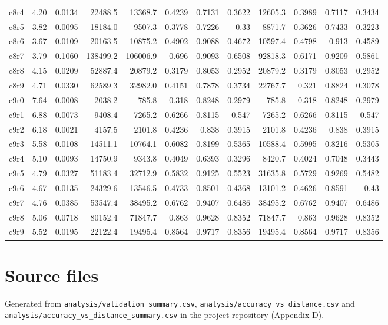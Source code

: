 \begin{landscape}
\begin{longtable}[]{@{}lrrrrrrrrrrr@{}}
c8r4 & 4.20 & 0.0134 & 22488.5 & 13368.7 & 0.4239 & 0.7131 & 0.3622 & 12605.3 & 0.3989 & 0.7117 & 0.3434 \\
c8r5 & 3.82 & 0.0095 & 18184.0 & 9507.3 & 0.3778 & 0.7226 & 0.33 & 8871.7 & 0.3626 & 0.7433 & 0.3223 \\
c8r6 & 3.67 & 0.0109 & 20163.5 & 10875.2 & 0.4902 & 0.9088 & 0.4672 & 10597.4 & 0.4798 & 0.913 & 0.4589 \\
c8r7 & 3.79 & 0.1060 & 138499.2 & 106006.9 & 0.696 & 0.9093 & 0.6508 & 92818.3 & 0.6171 & 0.9209 & 0.5861 \\
c8r8 & 4.15 & 0.0209 & 52887.4 & 20879.2 & 0.3179 & 0.8053 & 0.2952 & 20879.2 & 0.3179 & 0.8053 & 0.2952 \\
c8r9 & 4.71 & 0.0330 & 62589.3 & 32982.0 & 0.4151 & 0.7878 & 0.3734 & 22767.7 & 0.321 & 0.8824 & 0.3078 \\
c9r0 & 7.64 & 0.0008 & 2038.2 & 785.8 & 0.318 & 0.8248 & 0.2979 & 785.8 & 0.318 & 0.8248 & 0.2979 \\
c9r1 & 6.88 & 0.0073 & 9408.4 & 7265.2 & 0.6266 & 0.8115 & 0.547 & 7265.2 & 0.6266 & 0.8115 & 0.547 \\
c9r2 & 6.18 & 0.0021 & 4157.5 & 2101.8 & 0.4236 & 0.838 & 0.3915 & 2101.8 & 0.4236 & 0.838 & 0.3915 \\
c9r3 & 5.58 & 0.0108 & 14511.1 & 10764.1 & 0.6082 & 0.8199 & 0.5365 & 10588.4 & 0.5995 & 0.8216 & 0.5305 \\
c9r4 & 5.10 & 0.0093 & 14750.9 & 9343.8 & 0.4049 & 0.6393 & 0.3296 & 8420.7 & 0.4024 & 0.7048 & 0.3443 \\
c9r5 & 4.79 & 0.0327 & 51183.4 & 32712.9 & 0.5832 & 0.9125 & 0.5523 & 31635.8 & 0.5729 & 0.9269 & 0.5482 \\
c9r6 & 4.67 & 0.0135 & 24329.6 & 13546.5 & 0.4733 & 0.8501 & 0.4368 & 13101.2 & 0.4626 & 0.8591 & 0.43 \\
c9r7 & 4.76 & 0.0385 & 53547.4 & 38495.2 & 0.6762 & 0.9407 & 0.6486 & 38495.2 & 0.6762 & 0.9407 & 0.6486 \\
c9r8 & 5.06 & 0.0718 & 80152.4 & 71847.7 & 0.863 & 0.9628 & 0.8352 & 71847.7 & 0.863 & 0.9628 & 0.8352 \\
c9r9 & 5.52 & 0.0195 & 22122.4 & 19495.4 & 0.8564 & 0.9717 & 0.8356 & 19495.4 & 0.8564 & 0.9717 & 0.8356 \\
\bottomrule
\end{longtable}
\endgroup
\end{landscape}
\par\addvspace{\medskipamount}\restoreparskip

\hypertarget{source-files}{%
\section{Source files}\label{source-files}}

Generated from \texttt{analysis/\allowbreak{}validation\_\allowbreak{}summary.\allowbreak{}csv}, \texttt{analysis/\allowbreak{}accuracy\_\allowbreak{}vs\_\allowbreak{}distance.\allowbreak{}csv} and \texttt{analysis/\allowbreak{}accuracy\_\allowbreak{}vs\_\allowbreak{}distance\_\allowbreak{}summary.\allowbreak{}csv} in the project repository (Appendix D).
